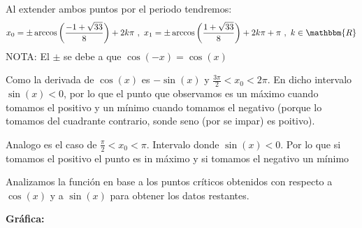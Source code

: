 \documentclass[12pt]{article}
\begin{document}
\begin{enumerate}[\hspace{9px} a)]
        Al extender ambos puntos por el periodo tendremos:
        \begin{align*}
            x_0 = \pm\arccos\left(\frac{-1+\sqrt{33}}{8}\right)+2k\pi \ , \ x_1 = \pm\arccos\left(\frac{1+\sqrt{33}}{8}\right)+2k\pi+\pi\ , \ k\in\mathbbm{R}
        \end{align*}
        NOTA: El \(\pm\) se debe a que \(\cos(-x)=\cos(x)\)\medskip

        Como la derivada de \(\cos(x)\) es \(-\sin(x)\) y \(\frac{3\pi}{2}<x_0<2\pi\). En dicho intervalo \(\sin(x)<0\), por lo que el punto que observamos es un m\'aximo cuando tomamos el positivo y un m\'inimo cuando tomamos el negativo (porque lo tomamos del cuadrante contrario, sonde seno (por se impar) es poitivo).

        Analogo es el caso de \(\frac{\pi}{2}<x_0<\pi\). Intervalo donde \(\sin(x)<0\). Por lo que si tomamos el positivo el punto es in m\'aximo y si tomamos el negativo un m\'inimo

        Analizamos la funci\'on en base a los puntos cr\'iticos obtenidos con respecto a \(\cos(x)\) y a \(\sin(x)\) para obtener los datos restantes.

    \textbf{Gr\'afica: }

\end{enumerate}
\end{document}
